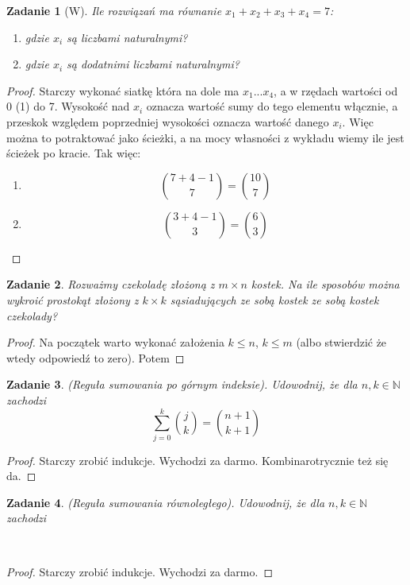 \documentclass{mwbk}
\newtheorem{zad}{Zadanie}[chapter]
\begin{document}
\begin{zad}[W]
    Ile rozwiązań ma równanie $x_1 + x_2+x_3+x_4 = 7$:
    \begin{enumerate}
        \item gdzie $x_i$ są liczbami naturalnymi?
        \item gdzie $x_i$ są dodatnimi liczbami naturalnymi?
    \end{enumerate}
\end{zad}
\begin{proof}
    Starczy wykonać siatkę która na dole ma $x_1 ... x_4$, a w rzędach
    wartości od 0 (1) do 7. Wysokość nad $x_i$ oznacza wartość sumy do
    tego elementu włącznie, a przeskok względem poprzedniej wysokości
    oznacza wartość danego $x_i$. Więc można to potraktować jako ścieżki,
    a na mocy własności z wykładu wiemy ile jest ścieżek po kracie. Tak więc:
    \begin{enumerate}
        \item \[\binom{7+4-1}{7}=\binom{10}{7}\]
        \item \[\binom{3+4-1}{3}=\binom{6}{3}\]
    \end{enumerate}
\end{proof}



\begin{zad}
    Rozważmy czekoladę złożoną z $m\times n$ kostek.
    Na ile sposobów można wykroić prostokąt złożony z $k \times k$
    sąsiadujących ze sobą kostek ze sobą kostek czekolady?
\end{zad}
\begin{proof}
    Na początek warto wykonać założenia $k \leq n$, $k \leq m$
    (albo stwierdzić że wtedy odpowiedź to zero). Potem
\end{proof}


\begin{zad}
    (Reguła sumowania po górnym indeksie). Udowodnij, że dla
    $n, k \in \mathbb{N}$ zachodzi
    \[\sum_{j=0}^k\binom{j}{k} = \binom{n+1}{k+1}\]
\end{zad}
\begin{proof}
    Starczy zrobić indukcje. Wychodzi za darmo.
    Kombinarotrycznie też się da.
\end{proof}

\begin{zad}
    (Reguła sumowania równoległego). Udowodnij, że dla $n, k \in \mathbb{N}$
    zachodzi \[     \]
\end{zad}\
\begin{proof}
    Starczy zrobić indukcje. Wychodzi za darmo.
\end{proof}
\end{document}
